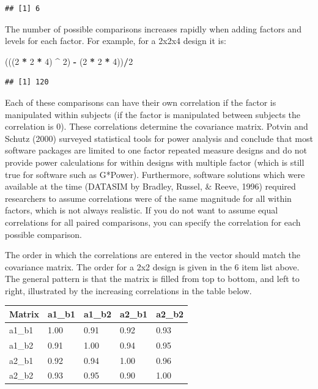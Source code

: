 \documentclass[]{book}
\newenvironment{Shaded}{\begin{snugshade}}{\end{snugshade}}
\newcommand{\DecValTok}[1]{\textcolor[rgb]{0.00,0.00,0.81}{#1}}
\newcommand{\NormalTok}[1]{#1}
\newcommand{\OperatorTok}[1]{\textcolor[rgb]{0.81,0.36,0.00}{\textbf{#1}}}
\newcommand{\StringTok}[1]{\textcolor[rgb]{0.31,0.60,0.02}{#1}}
\begin{document}
\begin{verbatim}
## [1] 6
\end{verbatim}

The number of possible comparisons increases rapidly when adding factors and levels for each factor. For example, for a 2x2x4 design it is:

\begin{Shaded}
\begin{Highlighting}[]
\NormalTok{(((}\DecValTok{2} \OperatorTok{*}\StringTok{ }\DecValTok{2} \OperatorTok{*}\StringTok{ }\DecValTok{4}\NormalTok{) }\OperatorTok{^}\StringTok{ }\DecValTok{2}\NormalTok{) }\OperatorTok{-}\StringTok{ }\NormalTok{(}\DecValTok{2} \OperatorTok{*}\StringTok{ }\DecValTok{2} \OperatorTok{*}\StringTok{ }\DecValTok{4}\NormalTok{))}\OperatorTok{/}\DecValTok{2}
\end{Highlighting}
\end{Shaded}

\begin{verbatim}
## [1] 120
\end{verbatim}

Each of these comparisons can have their own correlation if the factor is manipulated within subjects (if the factor is manipulated between subjects the correlation is 0). These correlations determine the covariance matrix. Potvin and Schutz (2000) surveyed statistical tools for power analysis and conclude that most software packages are limited to one factor repeated measure designs and do not provide power calculations for within designs with multiple factor (which is still true for software such as G*Power). Furthermore, software solutions which were available at the time (DATASIM by Bradley, Russel, \& Reeve, 1996) required researchers to assume correlations were of the same magnitude for all within factors, which is not always realistic. If you do not want to assume equal correlations for all paired comparisons, you can specify the correlation for each possible comparison.

The order in which the correlations are entered in the vector should match the covariance matrix.
The order for a 2x2 design is given in the 6 item list above. The general pattern is that the matrix is filled from top to bottom, and left to right, illustrated by the increasing correlations in the table below.

\begin{longtable}[]{@{}lllll@{}}
\toprule
Matrix & a1\_b1 & a1\_b2 & a2\_b1 & a2\_b2\tabularnewline
\midrule
\endhead
a1\_b1 & 1.00 & 0.91 & 0.92 & 0.93\tabularnewline
a1\_b2 & 0.91 & 1.00 & 0.94 & 0.95\tabularnewline
a2\_b1 & 0.92 & 0.94 & 1.00 & 0.96\tabularnewline
a2\_b2 & 0.93 & 0.95 & 0.90 & 1.00\tabularnewline
\bottomrule
\end{longtable}
\end{document}
